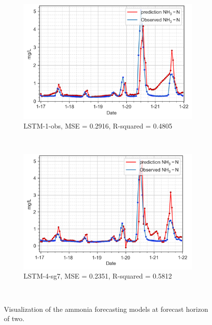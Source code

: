 \begin{figure}[!ht]
  \centering
  \begin{subfigure}[t]{0.75\textwidth}
    \includegraphics[width=\linewidth]{imgs/results/steps/nh3-lstm-1-fc2.png}
    \caption{LSTM-1-obs, MSE = 0.2916, R-squared = 0.4805} \label{fig:nh3-lstm-1-fc2}
  \end{subfigure}\\
  \vspace{2em}
  \begin{subfigure}[t]{0.75\textwidth}
    \includegraphics[width=\linewidth]{imgs/results/steps/nh3-lstm-4-fc2.png}
    \caption{LSTM-4-sg7, MSE = 0.2351, R-squared = 0.5812} \label{fig:nh3-lstm-4-fc2}
  \end{subfigure}\\
\caption{Visualization of the ammonia forecasting models at forecast horizon of two.} \label{fig:nh3-forecast-fc2}
\end{figure}


